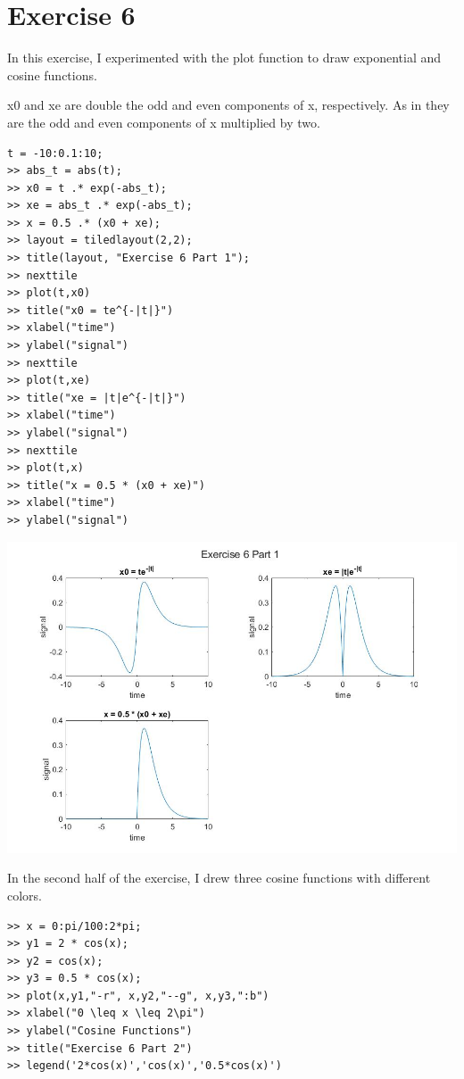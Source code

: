 \documentclass[11pt]{article}
\begin{document}
\section{Exercise 6}

In this exercise, I experimented with the plot function to draw exponential and cosine functions.

 x0 and xe are double the odd and even components of x, respectively. As in they are the odd and even components of x multiplied by two.

\begin{lstlisting}
t = -10:0.1:10;
>> abs_t = abs(t);
>> x0 = t .* exp(-abs_t);
>> xe = abs_t .* exp(-abs_t);
>> x = 0.5 .* (x0 + xe);
>> layout = tiledlayout(2,2);
>> title(layout, "Exercise 6 Part 1");
>> nexttile
>> plot(t,x0)
>> title("x0 = te^{-|t|}")
>> xlabel("time")
>> ylabel("signal")
>> nexttile
>> plot(t,xe)
>> title("xe = |t|e^{-|t|}")
>> xlabel("time")
>> ylabel("signal")
>> nexttile
>> plot(t,x)
>> title("x = 0.5 * (x0 + xe)")
>> xlabel("time")
>> ylabel("signal")
\end{lstlisting}

\includegraphics[width=\textwidth]{E6_pt1.jpg}

In the second half of the exercise, I drew three cosine functions with different colors.

\begin{lstlisting}
>> x = 0:pi/100:2*pi;
>> y1 = 2 * cos(x);
>> y2 = cos(x);
>> y3 = 0.5 * cos(x);
>> plot(x,y1,"-r", x,y2,"--g", x,y3,":b")
>> xlabel("0 \leq x \leq 2\pi")
>> ylabel("Cosine Functions")
>> title("Exercise 6 Part 2")
>> legend('2*cos(x)','cos(x)','0.5*cos(x)')
\end{lstlisting}
\end{document}
